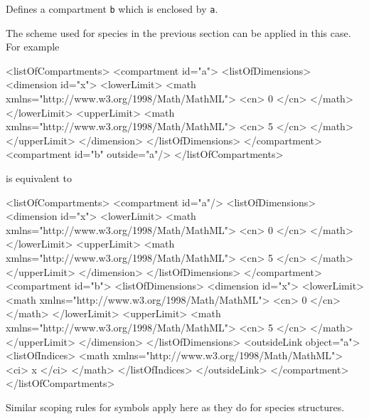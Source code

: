 \documentclass{cekarticle}
\begin{document}
Defines a compartment \texttt{b} which is enclosed by \texttt{a}.

The scheme used for species in the previous section can be applied in this case.
For example

\begin{example}
<listOfCompartments>
    <compartment id="a">
        <listOfDimensions>
            <dimension id="x">
                <lowerLimit>
                    <math xmlns="http://www.w3.org/1998/Math/MathML">
                        <cn> 0 </cn>
                    </math>
                </lowerLimit>
                <upperLimit>
                    <math xmlns="http://www.w3.org/1998/Math/MathML">
                        <cn> 5 </cn>
                    </math>
                </upperLimit>
            </dimension>
        </listOfDimensions>
    </compartment>
    <compartment id="b" outside="a"/>
</listOfCompartments>
\end{example}

is equivalent to

\begin{example}
<listOfCompartments>
    <compartment id="a"/>
        <listOfDimensions>
            <dimension id="x">
                <lowerLimit>
                    <math xmlns="http://www.w3.org/1998/Math/MathML">
                        <cn> 0 </cn>
                    </math>
                </lowerLimit>
                <upperLimit>
                    <math xmlns="http://www.w3.org/1998/Math/MathML">
                        <cn> 5 </cn>
                    </math>
                </upperLimit>
            </dimension>
        </listOfDimensions>
    </compartment>
    <compartment id="b">
        <listOfDimensions>
            <dimension id="x">
                <lowerLimit>
                    <math xmlns="http://www.w3.org/1998/Math/MathML">
                        <cn> 0 </cn>
                    </math>
                </lowerLimit>
                <upperLimit>
                    <math xmlns="http://www.w3.org/1998/Math/MathML">
                        <cn> 5 </cn>
                    </math>
                </upperLimit>
            </dimension>
        </listOfDimensions>
        <outsideLink object="a">
            <listOfIndices>
                <math xmlns="http://www.w3.org/1998/Math/MathML">
                    <ci> x </ci>
                </math>
            </listOfIndices>
        </outsideLink>
    </compartment>
</listOfCompartments>
\end{example}

Similar scoping rules for symbols apply here as they do for species structures.
\end{document}
